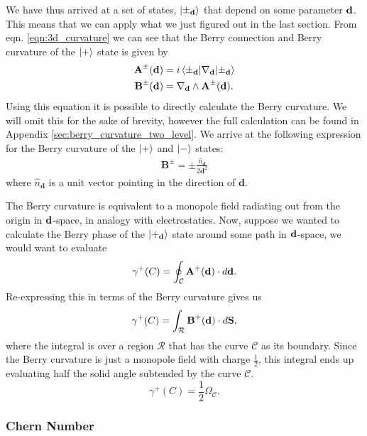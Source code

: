 We have thus arrived at a set of states, $\ket {\pm_{\bf d}}$ that depend on some parameter $\bf d$. This means that we can apply what we just figured out in the last section. From eqn. \ref{eqn:3d_curvature} we can see that the Berry connection and Berry curvature of the $\ket +$ state is given by
\begin{align}
    \textbf{A}^\pm (\bf d) &= i\braket{\pm_\textbf{d} | \nabla_\textbf{d}| \pm_\textbf{d}}\\
    \textbf{B}^{\pm}(\bf d ) &= \nabla_\textbf{d} \wedge \textbf{A}^\pm (\bf d).
\end{align}
Using this equation it is possible to directly calculate the Berry curvature. We will omit this for the sake of brevity, however the full calculation can be found in Appendix \ref{sec:berry_curvature_two_level}. We arrive at the following expression for the Berry curvature of the $\ket +$ and $\ket -$ states:
\begin{align}
    \textbf{B}^{\pm} = \pm \frac{\hat{n}_\textbf{d}}{2\textbf{d}^2}
\end{align}
where $\hat{n}_\textbf{d}$ is a unit vector pointing in the direction of $\textbf{d}$.\par
The Berry curvature is equivalent to a monopole field radiating out from the origin in $\bf d$-space, in analogy with electrostatics. Now, suppose we wanted to calculate the Berry phase of the $\ket{+_{\bf d}}$ state around some path in $\bf d$-space, we would want to evaluate
\begin{align}
	\gamma^+ (C) = \oint_{\mathcal C} \bf A^+ (\bf d) \cdot d \bf d.
\end{align}
Re-expressing this in terms of the Berry curvature gives us
\begin{align}
	\gamma^+ (C) = \int_{\mathcal R} \bf B^+ (\bf d) \cdot d \bf S,
\end{align}
where the integral is over a region $\mathcal R$ that has the curve $\mathcal C$ as its boundary. Since the Berry curvature is just a monopole field with charge $\frac{1}{2}$, this integral ends up evaluating half the solid angle subtended by the curve $\mathcal C$.
\begin{equation}
    \gamma^+ (C) = \frac{1}{2}\Omega_{\mathcal{C}}.
\end{equation}

\subsubsection{Chern Number}

